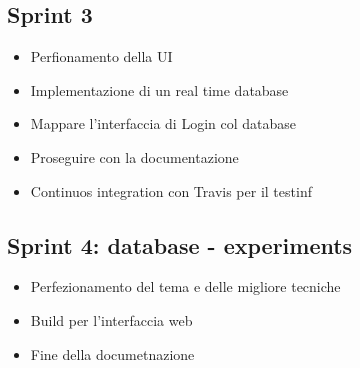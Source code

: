 \documentclass{article}
\begin{document}
\subsection{Sprint 3}
\begin{itemize}
    \item Perfionamento della UI
    \item Implementazione di un real time database
    \item Mappare l'interfaccia di Login col database
    \item Proseguire con la documentazione 
    \item Continuos integration con Travis per il testinf
\end{itemize}
\subsection{Sprint 4: database - experiments}
\begin{itemize}
    \item Perfezionamento del tema e delle migliore tecniche
    \item Build per l'interfaccia web
    \item Fine della documetnazione
   
\end{itemize}
\end{document}
